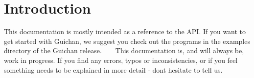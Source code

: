 \hypertarget{index_Introduction}{}\section{Introduction}\label{index_Introduction}
This documentation is mostly intended as a reference to the A\+PI. If you want to get started with Guichan, we suggest you check out the programs in the examples directory of the Guichan release. ~\newline
~\newline
This documentation is, and will always be, work in progress. If you find any errors, typos or inconsistencies, or if you feel something needs to be explained in more detail -\/ don\textquotesingle{}t hesitate to tell us. 